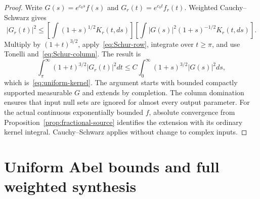 \documentclass[11pt,a4paper]{article}
\numberwithin{equation}{section}
\theoremstyle{definition}
\theoremstyle{remark}
\begin{document}
\begin{proof}
Write $G(s)=e^{c_0s}f(s)$ and $G_r(t)=e^{c_0t}f_r(t)$. Weighted Cauchy--Schwarz gives
\[
 |G_r(t)|^2
 \le\left[\int(1+s)^{1/2}K_r(t,ds)\right]
       \left[\int |G(s)|^2(1+s)^{-1/2}K_r(t,ds)\right].
\]
Multiply by $(1+t)^{3/2}$, apply~\eqref{eq:Schur-row}, integrate over $t\ge\pi$, and use Tonelli and~\eqref{eq:Schur-column}. The result is
\[
 \int_\pi^\infty(1+t)^{3/2}|G_r(t)|^2dt
 \le C\int_0^\infty(1+s)^{3/2}|G(s)|^2ds,
\]
which is~\eqref{eq:uniform-kernel}. The argument starts with bounded compactly supported measurable $G$ and extends by completion. The column domination ensures that input null sets are ignored for almost every output parameter. For the actual continuous exponentially bounded $f$, absolute convergence from Proposition~\ref{prop:fractional-source} identifies the extension with its ordinary kernel integral. Cauchy--Schwarz applies without change to complex inputs.
\end{proof}

\section{Uniform Abel bounds and full weighted synthesis}\label{sec:criterion}
\end{document}
